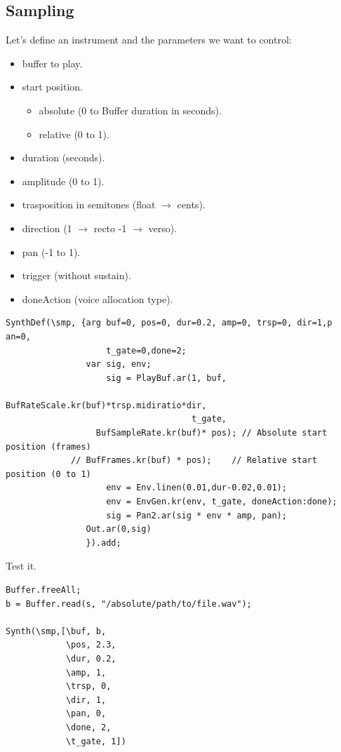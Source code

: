 \subsection{Sampling }\label{sampling}

Let's define an instrument and the parameters we want to control:

\begin{itemize}
\tightlist
\item buffer to play.
\item start position.

  \begin{itemize}
  \tightlist
  \item absolute (0 to Buffer duration in seconds).
  \item relative (0 to 1).
  \end{itemize}
\item duration (seconds).
\item amplitude (0 to 1).
\item trasposition in semitones (float \(\rightarrow\) cents).
\item direction (1 \(\rightarrow\) recto -1 \(\rightarrow\) verso).
\item pan (-1 to 1).
\item trigger (without sustain).
\item doneAction (voice allocation type).
\end{itemize}

\begin{lstlisting}[frame=single, caption=Sampler model] 
SynthDef(\smp, {arg buf=0, pos=0, dur=0.2, amp=0, trsp=0, dir=1,p an=0,
                    t_gate=0,done=2;
                var sig, env;
                    sig = PlayBuf.ar(1, buf,     
                                     BufRateScale.kr(buf)*trsp.midiratio*dir,           
                                     t_gate,                                
		          BufSampleRate.kr(buf)* pos); // Absolute start position (frames) 
	         // BufFrames.kr(buf) * pos);    // Relative start position (0 to 1)
                    env = Env.linen(0.01,dur-0.02,0.01);                  
                    env = EnvGen.kr(env, t_gate, doneAction:done);
                    sig = Pan2.ar(sig * env * amp, pan);
                Out.ar(0,sig)
                }).add;
\end{lstlisting}

Test it.

\begin{lstlisting}[frame=single] 
Buffer.freeAll;
b = Buffer.read(s, "/absolute/path/to/file.wav");

Synth(\smp,[\buf, b, 
            \pos, 2.3, 
            \dur, 0.2, 
            \amp, 1, 
            \trsp, 0, 
            \dir, 1, 
            \pan, 0, 
            \done, 2, 
            \t_gate, 1])
\end{lstlisting}


